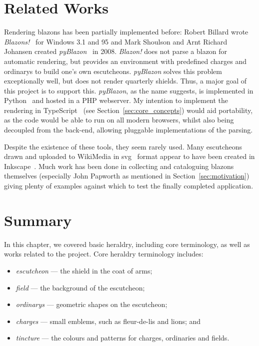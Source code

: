 \documentclass[nobib, a4paper, twoside, justified]{tufte-book}
\makeatletter
\newcommand{\svg}{\gls{svg}\@\xspace}
\newcommand{\charges}{\glspl{charge}\@\xspace}
\newcommand{\blazons}{\glspl{blazon}\@\xspace}
\makeatother
\begin{document}
\section{Related Works}%
\label{sec:related_works}

Rendering \blazons has been partially implemented before: Robert Billard wrote
\textit{Blazons!}~\autocite{dos_blazon} for Windows 3.1 and 95 and Mark Shoulson and Arnt Richard
Johansen created \textit{pyBlazon}~\autocite{pyblazon} in 2008. \textit{Blazon!} does not parse a
blazon for automatic rendering, but provides an environment with predefined \charges and
\glspl{ordinary} to build one's own \glspl{escutcheon}. \textit{pyBlazon} solves this problem
exceptionally well, but does not render quarterly shields. Thus, a major goal of this project is to
support this. \textit{pyBlazon}, as the name suggests, is implemented in Python~\autocite{python}
and hosted in a PHP webserver. My intention to implement the rendering in
TypeScript~\autocite{typescript} (see Section~\ref{sec:core_concepts}) would aid portability, as
the code would be able to run on all modern browsers, whilst also being decoupled from the
back-end, allowing pluggable implementations of the parsing.

Despite the existence of these tools, they seem rarely used. Many escutcheons drawn and uploaded to
WikiMedia in \svg~\autocite{ferraiolo2000scalable} format appear to have been created in
Inkscape~\autocite{inkscape}. Much work has been done in collecting and cataloguing \blazons
themselves (especially John Papworth as mentioned in Section~\ref{sec:motivation}) giving plenty of
examples against which to test the finally completed application.

\section{Summary}%
\label{sec:background_summary}

In this chapter, we covered basic heraldry, including core terminology, as well as works related to
the project. Core heraldry terminology includes:

\pagebreak%

\begin{itemize}
  \item \textit{\Gls{escutcheon}} --- the shield in the coat of arms;
  \item \textit{\Gls{field}} --- the background of the escutcheon;
  \item \textit{\Glspl{ordinary}} --- geometric shapes on the escutcheon;
  \item \textit{\Glspl{charge}} --- small emblems, such as fleur-de-lis and lions; and
  \item \textit{\Gls{tincture}} --- the colours and patterns for \charges, ordinaries and fields.
\end{itemize}
\end{document}

